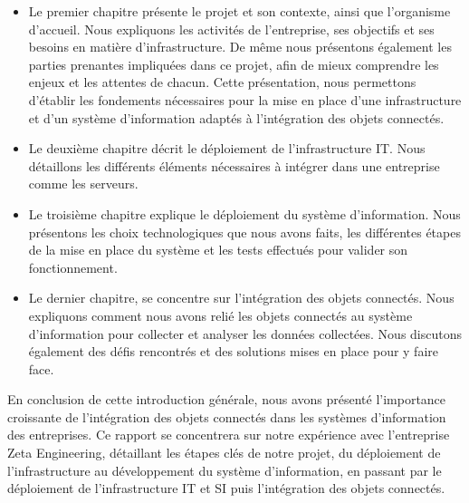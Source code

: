 {\begin{itemize}
  \item Le premier chapitre présente le projet et son contexte, ainsi que l'organisme d'accueil. Nous expliquons les activités de l'entreprise, ses objectifs et ses besoins en matière d'infrastructure. De même nous présentons également les parties prenantes impliquées dans ce projet, afin de mieux comprendre les enjeux et les attentes de chacun. Cette présentation, nous permettons d'établir les fondements nécessaires pour la mise en place d'une infrastructure et d'un système d'information adaptés à l'intégration des objets connectés. \\
  \item Le deuxième chapitre décrit le déploiement de l'infrastructure IT. Nous détaillons les différents éléments nécessaires à intégrer dans une entreprise comme les serveurs. \\
  \item Le troisième chapitre explique le déploiement du système d'information. Nous présentons les choix technologiques que nous avons faits, les différentes étapes de la mise en place du système et les tests effectués pour valider son fonctionnement. \\
  \item Le dernier chapitre, se concentre sur l'intégration des objets connectés. Nous expliquons comment nous avons relié les objets connectés au système d'information pour collecter et analyser les données collectées. Nous discutons également des défis rencontrés et des solutions mises en place pour y faire face. \\
\end{itemize}

En conclusion de cette introduction générale, nous avons présenté l'importance croissante de l'intégration des objets connectés dans les systèmes d’information des entreprises. Ce rapport se concentrera sur notre expérience avec l'entreprise Zeta Engineering, détaillant les étapes clés de notre projet, du déploiement de l'infrastructure au développement du système d'information, en passant par le déploiement de l'infrastructure IT et SI puis l'intégration  des objets connectés.



}
